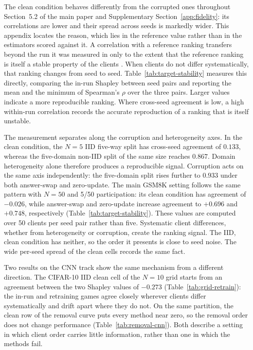 \documentclass[letterpaper]{article} %
\theoremstyle{plain}
\begin{document}
The clean condition behaves differently from the corrupted ones throughout
Section~5.2 of the main paper and Supplementary
Section~\ref{app:fidelity}: its correlations are lower and their spread across
seeds is markedly wider. This appendix locates the reason, which lies in the
reference value rather than in the estimators scored against it. A correlation
with a reference ranking transfers beyond the run it was measured in only to
the extent that the reference ranking is itself a stable property of the
clients \citep{geimer2025volatility}. When clients do not differ
systematically, that ranking changes from seed to seed.
Table~\ref{tab:target-stability} measures this directly, comparing the in-run
Shapley between seed pairs and reporting the mean and the minimum of
Spearman's $\rho$ over the three pairs. Larger values indicate a more
reproducible ranking. Where cross-seed agreement is low, a high within-run
correlation records the accurate reproduction of a ranking that is itself
unstable.

The measurement separates along the corruption and heterogeneity axes. In the
clean condition, the $N{=}5$ IID five-way split has cross-seed agreement of
$0.133$, whereas the five-domain non-IID split of the same size reaches
$0.867$. Domain heterogeneity alone therefore produces a reproducible signal.
Corruption acts on the same axis independently: the five-domain split rises
further to $0.933$ under both answer-swap and zero-update. The main GSM8K
setting follows the same pattern with
$N{=}50$ and 5/50 participation: its clean condition has agreement of
$-0.026$, while answer-swap and zero-update increase agreement to $+0.696$
and $+0.748$, respectively (Table~\ref{tab:target-stability}). These values
are computed over 50 clients per seed pair rather than five. Systematic client
differences, whether from heterogeneity or corruption, create the ranking
signal. The IID, clean condition has neither, so the order it presents is
close to seed noise. The wide per-seed spread of the clean cells records the
same fact.

Two results on the CNN track show the same mechanism from a different
direction. The CIFAR-10 IID clean cell of the $N{=}10$ grid starts from an
agreement between the two Shapley values of $-0.273$
(Table~\ref{tab:grid-retrain}): the in-run and retraining games agree closely
wherever clients differ systematically and drift apart where they do not. On
the same partition, the clean row of the removal curve puts every method near
zero, so the removal order does not change performance
(Table~\ref{tab:removal-cnn}). Both describe a setting in which client order
carries little information, rather than one in which the methods fail.
\end{document}
